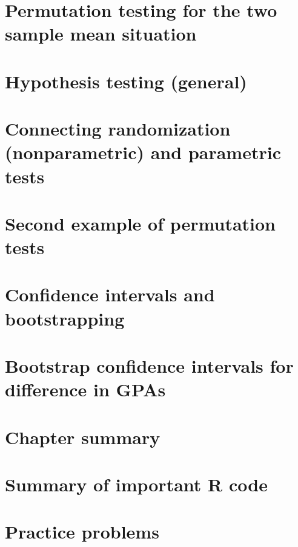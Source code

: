 \documentclass[]{book}
\begin{document}
\hypertarget{section2-4}{%
\section{Permutation testing for the two sample mean situation}\label{section2-4}}

\hypertarget{section2-5}{%
\section{Hypothesis testing (general)}\label{section2-5}}

\hypertarget{section2-6}{%
\section{Connecting randomization (nonparametric) and parametric tests}\label{section2-6}}

\hypertarget{section2-7}{%
\section{Second example of permutation tests}\label{section2-7}}

\hypertarget{section2-8}{%
\section{Confidence intervals and bootstrapping}\label{section2-8}}

\hypertarget{section2-9}{%
\section{Bootstrap confidence intervals for difference in GPAs}\label{section2-9}}

\hypertarget{section2-10}{%
\section{Chapter summary}\label{section2-10}}

\hypertarget{section2-11}{%
\section{Summary of important R code}\label{section2-11}}

\hypertarget{section2-12}{%
\section{Practice problems}\label{section2-12}}
\end{document}
